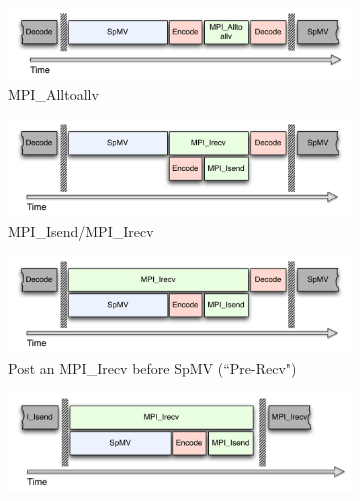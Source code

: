\documentclass{report}
\begin{document}
\begin{figure} 
\centering
\begin{subfigure}{0.48\textwidth}
\centering
\includegraphics[width=\textwidth]{../figures/omnigraffle/AlltoallvCPU.pdf}
\caption{MPI\_Alltoallv}
\label{fig:alltoallv_cpu}
\end{subfigure}
\begin{subfigure}{0.48\textwidth}
\centering
\includegraphics[width=\textwidth]{../figures/omnigraffle/IsendIrecvCPU.pdf}
\caption{MPI\_Isend/MPI\_Irecv}
\label{fig:isendirecv_cpu}
\end{subfigure}
\begin{subfigure}{0.48\textwidth}
\centering
\includegraphics[width=\textwidth]{../figures/omnigraffle/IsendPreIrecvCPU.pdf}
\caption{Post an MPI\_Irecv before SpMV (``Pre-Recv")}
\label{fig:preirecv_cpu}
\end{subfigure}
\begin{subfigure}{0.48\textwidth}
\centering
\includegraphics[width=\textwidth]{../figures/omnigraffle/NoDecode.pdf}

\end{subfigure}
\end{figure}
\end{document}
